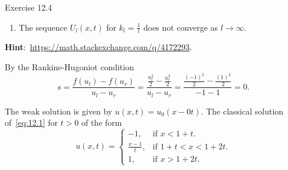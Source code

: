 \begin{frame}
\begin{alertblock}{Exercise 12.4}
\begin{enumerate}
            \item

                  The sequence
                  \begin{math}
                      U_{l}
                      \left(x,t\right)
                  \end{math}
                  for
                  \begin{math}
                      k_{l}=\frac{1}{l}
                  \end{math}
                  does not converge as $l\to\infty$.
        \end{enumerate}
        \textbf{Hint}:~\url{https://math.stackexchange.com/q/4172293}.
    \end{alertblock}

    \begin{proofs}[Solution 1]
        By the Rankine-Hugoniot condition
        \begin{equation*}
            s=
            \frac{f\left(u_{l}\right)-f\left(u_{r}\right)}{u_{l}-u_{r}}=
            \frac{\frac{u_l^{2}}{2}-\frac{u_{r}^{2}}{2}}{u_{l}-u_{r}}=
            \frac{\frac{(-1)^{2}}{2}-\frac{(1)^{2}}{2}}{-1-1}=
            0.
        \end{equation*}

        The weak solution is given by
        \begin{math}
            u
            \left(x,t\right)=
            u_{0}
            \left(x-0t\right)
        \end{math}.
        The classical solution of~\eqref{eq:12.1} for $t>0$ of the
        form
        \begin{equation*}
            u
            \left(x,t\right)=
            \begin{cases}
                -1,            & \text{if } x<1+t.      \\
                \frac{x-1}{t}, & \text{if } 1+t<x<1+2t. \\
                1,             & \text{if } x>1+2t.
            \end{cases}
        \end{equation*}



\end{proofs}
\end{frame}
